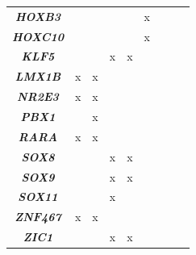 \begin{table}[]
{\begin{tabular}{@{}|c|c|c|c|c|c|c|c|c|@{}}
\textit{\textbf{HOXB3}} &  &  &  &  & x \\
\textit{\textbf{HOXC10}} &  &  &  &  & x \\
\textit{\textbf{KLF5}} &  &  & x & x &  \\
\textit{\textbf{LMX1B}} & x & x &  &  &  \\
\textit{\textbf{NR2E3}} & x & x &  &  &  \\
\textit{\textbf{PBX1}} &  & x &  &  &  \\
\textit{\textbf{RARA}} & x & x &  &  &  \\
\textit{\textbf{SOX8}} &  &  & x & x &  \\
\textit{\textbf{SOX9}} &  &  & x & x &  \\
\textit{\textbf{SOX11}} &  &  & x &  &  \\
\textit{\textbf{ZNF467}} & x & x &  &  &  \\
\textit{\textbf{ZIC1}} &  &  & x & x &  \\  \hline
\end{tabular}
}
\end{table}
